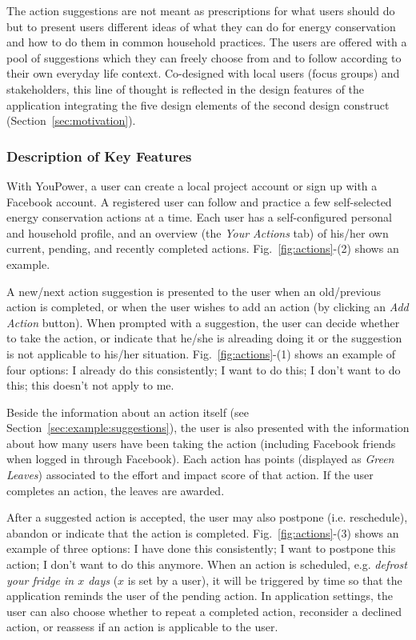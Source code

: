 \documentclass[a4paper,10pt]{article}
\begin{document}
The action suggestions are not meant as prescriptions for what users should do but to present users different ideas of what they can do for energy conservation and how to do them in common household practices. The users are offered with a pool of suggestions which they can freely choose from and to follow according to their own everyday life context. Co-designed with local users (focus groups) and stakeholders, this line of thought is reflected in the design features of the application integrating the five design elements of the second design construct (Section~\ref{sec:motivation}).  


\subsubsection{Description of Key Features}
\label{sec:example:motivation:features}

With YouPower, a user can create a local project account or sign up with a Facebook account. A registered user can follow and practice a few self-selected energy conservation actions at a time. Each user has a self-configured personal and household profile, and an overview (the \textit{Your Actions} tab) of his/her own current, pending, and recently completed actions. Fig.~\ref{fig:actions}-(2) shows an example. 

A new/next action suggestion is presented to the user when an old/previous action is completed, or when the user wishes to add an action (by clicking an \textit{Add Action} button). When prompted with a suggestion, the user can decide whether to take the action, or indicate that he/she is alreading doing it or the suggestion is not applicable to his/her situation. Fig.~\ref{fig:actions}-(1) shows an example of four options: I already do this consistently; I want to do this; I don't want to do this; this doesn't not apply to me. 

Beside the information about an action itself (see Section~\ref{sec:example:suggestions}), the user is also presented with the information about how many users have been taking the action (including Facebook friends when logged in through Facebook). Each action has points (displayed as \textit{Green Leaves}) associated to the effort and impact score of that action. If the user completes an action, the leaves are awarded. 

After a suggested action is accepted, the user may also postpone (i.e. reschedule), abandon or indicate that the action is completed. Fig.~\ref{fig:actions}-(3) shows an example of three options: I have done this consistently; I want to postpone this action; I don't want to do this anymore. When an action is scheduled, e.g. \textit{defrost your fridge in $x$ days} ($x$ is set by a user), it will be triggered by time so that the application reminds the user of the pending action. In application settings, the user can also choose whether to repeat a completed action, reconsider a declined action, or reassess if an action is applicable to the user. 
\end{document}
